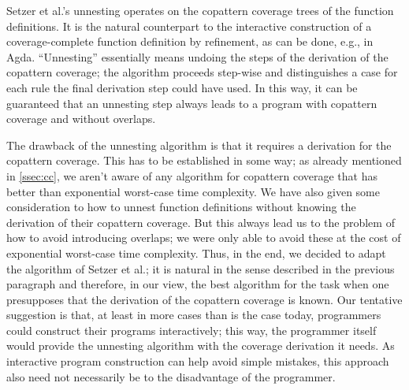 Setzer et al.'s\cite{setzer14unnesting} unnesting operates on the copattern coverage trees of the function definitions. It is the natural counterpart to the interactive construction of a coverage-complete function definition by refinement, as can be done, e.g., in Agda. ``Unnesting'' essentially means undoing the steps of the derivation of the copattern coverage; the algorithm proceeds step-wise and distinguishes a case for each rule the final derivation step could have used. In this way, it can be guaranteed that an unnesting step always leads to a program with copattern coverage and without overlaps.

The drawback of the unnesting algorithm is that it requires a derivation for the copattern coverage. This has to be established in some way; as already mentioned in \autoref{ssec:cc}, we aren't aware of any algorithm for copattern coverage that has better than exponential worst-case time complexity. We have also given some consideration to how to unnest function definitions without knowing the derivation of their copattern coverage. But this always lead us to the problem of how to avoid introducing overlaps; we were only able to avoid these at the cost of exponential worst-case time complexity. Thus, in the end, we decided to adapt the algorithm of Setzer et al.; it is natural in the sense described in the previous paragraph and therefore, in our view, the best algorithm for the task when one presupposes that the derivation of the copattern coverage is known. Our tentative suggestion is that, at least in more cases than is the case today, programmers could construct their programs interactively; this way, the programmer itself would provide the unnesting algorithm with the coverage derivation it needs. As interactive program construction can help avoid simple mistakes, this approach also need not necessarily be to the disadvantage of the programmer.

